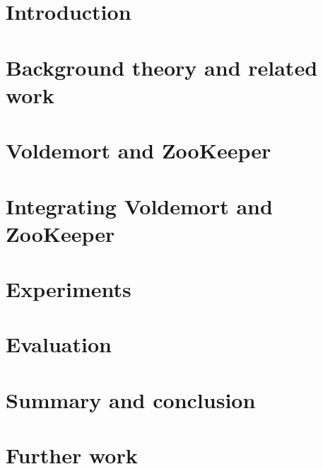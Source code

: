 \documentclass[a4paper, 12pt, twoside, openright]{book}
\begin{document}


\clearpage


\clearpage

\tableofcontents
\clearpage

\listoffigures

\clearpage
\setcounter{page}{1}

\chapter{Introduction}
\label{chapter:introduction}


\clearpage


\clearpage

\chapter{Background theory and related work}
\label{chapter:background}

\clearpage


\clearpage


\clearpage



\chapter{Voldemort and ZooKeeper}
\label{chapter:voldemort_and_zookeeper}


\clearpage


\clearpage

\chapter{Integrating Voldemort and ZooKeeper}
\label{chapter:implementation}

\clearpage

\chapter{Experiments}
\label{chapter:results}



\chapter{Evaluation}
\label{chapter:evaluation}


\chapter{Summary and conclusion}
\label{chapter:summary}


\chapter{Further work}
\label{chapter:futurework}




\end{document}
